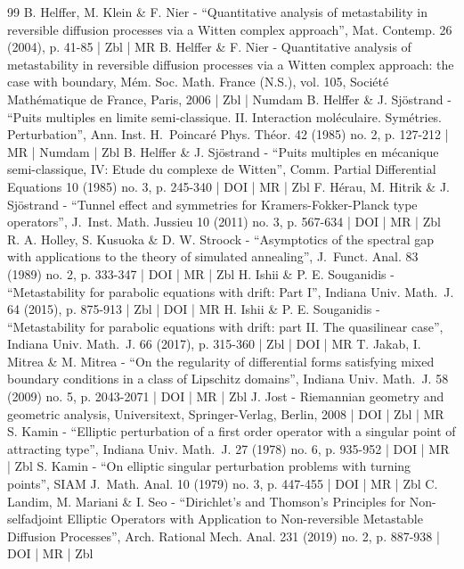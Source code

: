 \documentclass[10pt]{amsart}
\theoremstyle{plain}
\theoremstyle{definition}
\begin{document}
\begin{thebibliography}{99}
B. Helffer, M. Klein \& F. Nier - “Quantitative analysis of metastability in reversible diffusion processes via a Witten complex approach”, Mat. Contemp. 26 (2004), p. 41-85 | Zbl | MR
B. Helffer \& F. Nier - Quantitative analysis of metastability in reversible diffusion processes via a Witten complex approach: the case with boundary, Mém. Soc. Math. France (N.S.), vol. 105, Société Mathématique de France, Paris, 2006 | Zbl | Numdam
B. Helffer \& J. Sjöstrand - “Puits multiples en limite semi-classique. II. Interaction moléculaire. Symétries. Perturbation”, Ann. Inst. H. Poincaré Phys. Théor. 42 (1985) no. 2, p. 127-212 | MR | Numdam | Zbl
B. Helffer \& J. Sjöstrand - “Puits multiples en mécanique semi-classique, IV: Etude du complexe de Witten”, Comm. Partial Differential Equations 10 (1985) no. 3, p. 245-340 | DOI | MR | Zbl
F. Hérau, M. Hitrik \& J. Sjöstrand - “Tunnel effect and symmetries for Kramers-Fokker-Planck type operators”, J. Inst. Math. Jussieu 10 (2011) no. 3, p. 567-634 | DOI | MR | Zbl
R. A. Holley, S. Kusuoka \& D. W. Stroock - “Asymptotics of the spectral gap with applications to the theory of simulated annealing”, J. Funct. Anal. 83 (1989) no. 2, p. 333-347 | DOI | MR | Zbl
H. Ishii \& P. E. Souganidis - “Metastability for parabolic equations with drift: Part I”, Indiana Univ. Math. J. 64 (2015), p. 875-913 | Zbl | DOI | MR
H. Ishii \& P. E. Souganidis - “Metastability for parabolic equations with drift: part II. The quasilinear case”, Indiana Univ. Math. J. 66 (2017), p. 315-360 | Zbl | DOI | MR
T. Jakab, I. Mitrea \& M. Mitrea - “On the regularity of differential forms satisfying mixed boundary conditions in a class of Lipschitz domains”, Indiana Univ. Math. J. 58 (2009) no. 5, p. 2043-2071 | DOI | MR | Zbl
J. Jost - Riemannian geometry and geometric analysis, Universitext, Springer-Verlag, Berlin, 2008 | DOI | Zbl | MR
S. Kamin - “Elliptic perturbation of a first order operator with a singular point of attracting type”, Indiana Univ. Math. J. 27 (1978) no. 6, p. 935-952 | DOI | MR | Zbl
S. Kamin - “On elliptic singular perturbation problems with turning points”, SIAM J. Math. Anal. 10 (1979) no. 3, p. 447-455 | DOI | MR | Zbl
C. Landim, M. Mariani \& I. Seo - “Dirichlet’s and Thomson’s Principles for Non-selfadjoint Elliptic Operators with Application to Non-reversible Metastable Diffusion Processes”, Arch. Rational Mech. Anal. 231 (2019) no. 2, p. 887-938 | DOI | MR | Zbl

\end{thebibliography}
\end{document}
